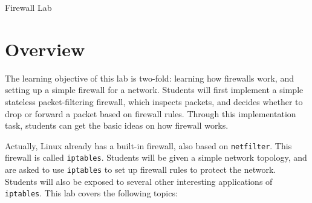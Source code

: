 
\newcommand{\commonfolder}{../../common-files}





\newcommand{\telnet} {\texttt{telnet}\xspace}
\newcommand{\iptables}{\texttt{iptables}\xspace}
\newcommand{\netfilter}{\texttt{netfilter}\xspace}
\newcommand{\Netfilter}{\texttt{Netfilter}\xspace}

\newcommand{\firewallFigs}{./Figs}





\begin{center}
{\LARGE Firewall Lab}
\end{center}




\section{Overview}

The learning objective of this lab is two-fold: learning
how firewalls work, and setting up a simple firewall
for a network. Students will first 
implement a simple stateless packet-filtering firewall, 
which inspects packets, and decides 
whether to drop or forward a packet based on firewall rules. 
Through this implementation task, students can get the 
basic ideas on how firewall works.


Actually, Linux already has a built-in firewall, also based on 
\texttt{netfilter}. This firewall is called \iptables. 
Students will be given a simple network topology, and are asked to
use \iptables to set up firewall rules to protect the network. 
Students will also be exposed to several other interesting 
applications of \iptables. 
This lab covers the following topics:



